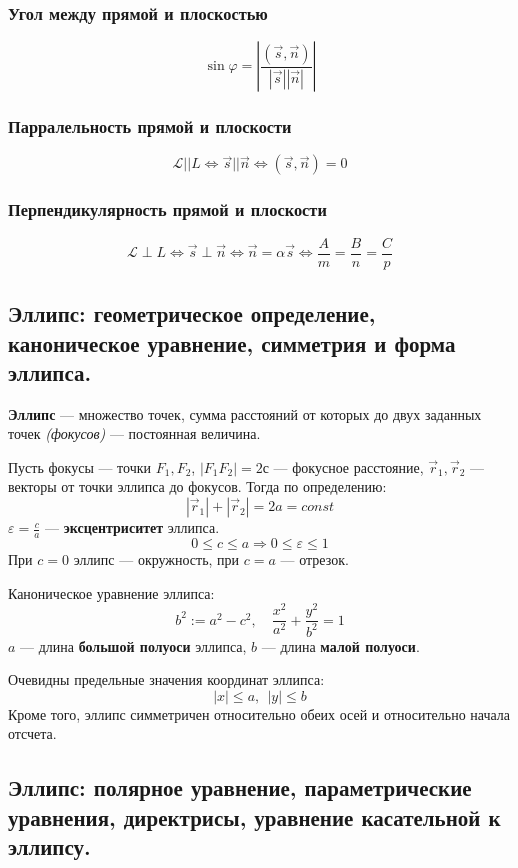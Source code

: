 \subsubsection{Угол между прямой и плоскостью}
$$\sin\varphi=\left|\frac{(\vec s, \vec n)}{|\vec s||\vec n|}\right|$$
\subsubsection{Парралельность прямой и плоскости}
$$\mathcal L||L\Leftrightarrow \vec s||\vec n\Leftrightarrow (\vec s,\vec n)=0$$
\subsubsection{Перпендикулярность прямой и плоскости}
$$\mathcal L\perp L\Leftrightarrow \vec s\perp\vec n\Leftrightarrow \vec n=\alpha\vec s\Leftrightarrow\frac{A}{m}=\frac{B}{n}=\frac{C}{p}$$

\subsection{Эллипс: геометрическое определение, каноническое уравнение, симметрия и форма эллипса.}
\begin{definition}
    \textbf{Эллипс} --- множество точек, сумма расстояний от которых до двух заданных точек \textit{(фокусов)} --- постоянная величина.
\end{definition}

Пусть фокусы --- точки $F_1, F_2$, $|F_1F_2|=2с$ --- фокусное расстояние, $\vec r_1, \vec r_2$ --- векторы от точки эллипса до фокусов. Тогда по определению:
$$|\vec r_1|+|\vec r_2|=2a=const$$
$\varepsilon=\frac{c}{a}$ --- \textbf{эксцентриситет} эллипса.
$$0\leq c\leq a\Rightarrow 0\leq \varepsilon\leq 1$$
При $c=0$ эллипс --- окружность, при $c=a$ --- отрезок.

Каноническое уравнение эллипса:
$$b^2:=a^2-c^2,\quad \frac{x^2}{a^2}+\frac{y^2}{b^2}=1$$
$a$ --- длина \textbf{большой полуоси} эллипса, $b$ --- длина \textbf{малой полуоси}.

Очевидны предельные значения координат эллипса:
$$|x|\leq a, \ \ |y|\leq b$$
Кроме того, эллипс симметричен относительно обеих осей и относительно начала отсчета.

\subsection{Эллипс: полярное
уравнение, параметрические уравнения, директрисы, уравнение касательной к
эллипсу.}

